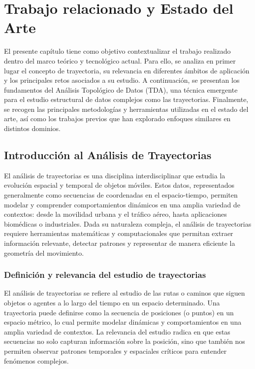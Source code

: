 \chapter{Trabajo relacionado y Estado del Arte} \label{chp:state-of-the-art}

El presente capítulo tiene como objetivo contextualizar el trabajo realizado dentro del marco teórico y tecnológico actual. Para ello, se analiza en primer lugar el concepto de trayectoria, su relevancia en diferentes ámbitos de aplicación y los principales retos asociados a su estudio. A continuación, se presentan los fundamentos del Análisis Topológico de Datos (TDA), una técnica emergente para el estudio estructural de datos complejos como las trayectorias. Finalmente, se recogen las principales metodologías y herramientas utilizadas en el estado del arte, así como los trabajos previos que han explorado enfoques similares en distintos dominios.

\section{Introducción al Análisis de Trayectorias}

El análisis de trayectorias es una disciplina interdisciplinar que estudia la evolución espacial y temporal de objetos móviles. Estos datos, representados generalmente como secuencias de coordenadas en el espacio-tiempo, permiten modelar y comprender comportamientos dinámicos en una amplia variedad de contextos: desde la movilidad urbana y el tráfico aéreo, hasta aplicaciones biomédicas o industriales. Dada su naturaleza compleja, el análisis de trayectorias requiere herramientas matemáticas y computacionales que permitan extraer información relevante, detectar patrones y representar de manera eficiente la geometría del movimiento.

\subsection{Definición y relevancia del estudio de trayectorias}

El análisis de trayectorias se refiere al estudio de las rutas o caminos que siguen objetos o agentes a lo largo del tiempo en un espacio determinado. Una trayectoria puede definirse como la secuencia de posiciones (o puntos) en un espacio métrico, lo cual permite modelar dinámicas y comportamientos en una amplia variedad de contextos. La relevancia del estudio radica en que estas secuencias no solo capturan información sobre la posición, sino que también nos permiten observar patrones temporales y espaciales críticos para entender fenómenos complejos.

